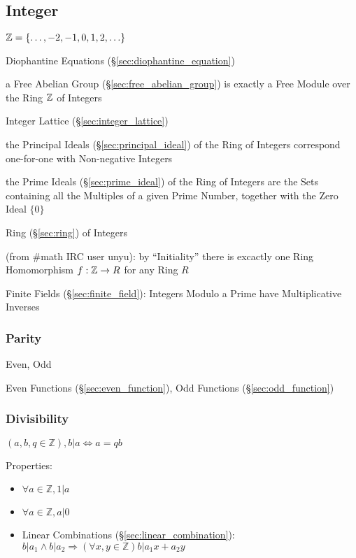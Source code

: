 \subsection{Integer}\label{sec:integer}

$\mathbb{Z} = \{ \ldots, -2, -1, 0, 1, 2, \ldots \}$

\fist Diophantine Equations (\S\ref{sec:diophantine_equation})

\fist a Free Abelian Group (\S\ref{sec:free_abelian_group}) is exactly a Free
Module over the Ring $\mathbb{Z}$ of Integers

\fist Integer Lattice (\S\ref{sec:integer_lattice})

the Principal Ideals (\S\ref{sec:principal_ideal}) of the Ring of Integers
correspond one-for-one with Non-negative Integers

the Prime Ideals (\S\ref{sec:prime_ideal}) of the Ring of Integers are the Sets
containing all the Multiples of a given Prime Number, together with the Zero
Ideal $\{0\}$

Ring (\S\ref{sec:ring}) of Integers

(from \#math IRC user unyu): by ``Initiality'' there is excactly one Ring
Homomorphism $f : \mathbb{Z} \rightarrow R$ for any Ring $R$

Finite Fields (\S\ref{sec:finite_field}): Integers Modulo a Prime have
Multiplicative Inverses



\subsubsection{Parity}\label{sec:parity}

Even, Odd

\fist Even Functions (\S\ref{sec:even_function}), Odd Functions
(\S\ref{sec:odd_function})



\subsubsection{Divisibility}\label{sec:divisibility}

$(a,b,q \in \mathbb{Z}), b|a \Leftrightarrow a = qb$

Properties:

\begin{itemize}
\item $\forall a \in \mathbb{Z}, 1|a$
\item $\forall a \in \mathbb{Z}, a|0$
\item Linear Combinations (\S\ref{sec:linear_combination}): $b|a_1
  \wedge b|a_2 \Rightarrow (\forall x,y \in \mathbb{Z})b|a_1 x + a_2
  y$
\end{itemize}




